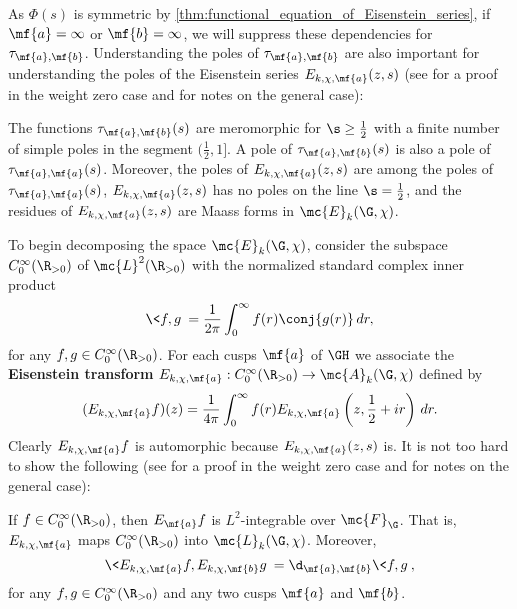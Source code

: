    As $\Phi(s)$ is symmetric by \cref{thm:functional_equation_of_Eisenstein_series}, if $\mf{a} = \infty$ or $\mf{b} = \infty$, we will suppress these dependencies for $\tau_{\mf{a},\mf{b}}$. Understanding the poles of $\tau_{\mf{a},\mf{b}}$ are also important for understanding the poles of the Eisenstein series $E_{k,\chi,\mf{a}}(z,s)$ (see \cite{iwaniec2002spectral} for a proof in the weight zero case and \cite{duke2002subconvexity} for notes on the general case):

    \begin{theorem}\label{thm:residues_of_Eisenstein_series}
      The functions $\tau_{\mf{a},\mf{b}}(s)$ are meromorphic for $\s \ge \frac{1}{2}$ with a finite number of simple poles in the segment $(\frac{1}{2},1]$. A pole of $\tau_{\mf{a},\mf{b}}(s)$ is also a pole of $\tau_{\mf{a},\mf{a}}(s)$. Moreover, the poles of $E_{k,\chi,\mf{a}}(z,s)$ are among the poles of $\tau_{\mf{a},\mf{a}}(s)$, $E_{k,\chi,\mf{a}}(z,s)$ has no poles on the line $\s = \frac{1}{2}$, and the residues of $E_{k,\chi,\mf{a}}(z,s)$ are Maass forms in $\mc{E}_{k}(\G,\chi)$.
    \end{theorem}

    To begin decomposing the space $\mc{E}_{k}(\G,\chi)$, consider the subspace $C_{0}^{\infty}(\R_{> 0})$ of $\mc{L}^{2}(\R_{> 0})$ with the normalized standard complex inner product
    \[
      \<f,g\> = \frac{1}{2\pi}\int_{0}^{\infty}f(r)\conj{g(r)}\,dr,
    \]
    for any $f,g \in C_{0}^{\infty}(\R_{> 0})$. For each cusps $\mf{a}$ of $\GH$ we associate the \textbf{Eisenstein transform} $E_{k,\chi,\mf{a}}:C_{0}^{\infty}(\R_{> 0}) \to \mc{A}_{k}(\G,\chi)$ defined by
    \[
      (E_{k,\chi,\mf{a}}f)(z) = \frac{1}{4\pi}\int_{0}^{\infty}f(r)E_{k,\chi,\mf{a}}\left(z,\frac{1}{2}+ir\right)\,dr.
    \]
    Clearly $E_{k,\chi,\mf{a}}f$ is automorphic because $E_{k,\chi,\mf{a}}(z,s)$ is. It is not too hard to show the following (see \cite{iwaniec2002spectral} for a proof in the weight zero case and \cite{duke2002subconvexity} for notes on the general case):

    \begin{proposition}\label{prop:Eisenstein_transform_property}
      If $f \in C_{0}^{\infty}(\R_{> 0})$, then $E_{\mf{a}}f$ is $L^{2}$-integrable over $\mc{F}_{\G}$. That is, $E_{k,\chi,\mf{a}}$ maps $C_{0}^{\infty}(\R_{> 0})$ into $\mc{L}_{k}(\G,\chi)$. Moreover,
      \[
        \<E_{k,\chi,\mf{a}}f,E_{k,\chi,\mf{b}}g\> = \d_{\mf{a},\mf{b}}\<f,g\>,
      \]
      for any $f,g \in C_{0}^{\infty}(\R_{> 0})$ and any two cusps $\mf{a}$ and $\mf{b}$.
    \end{proposition}

